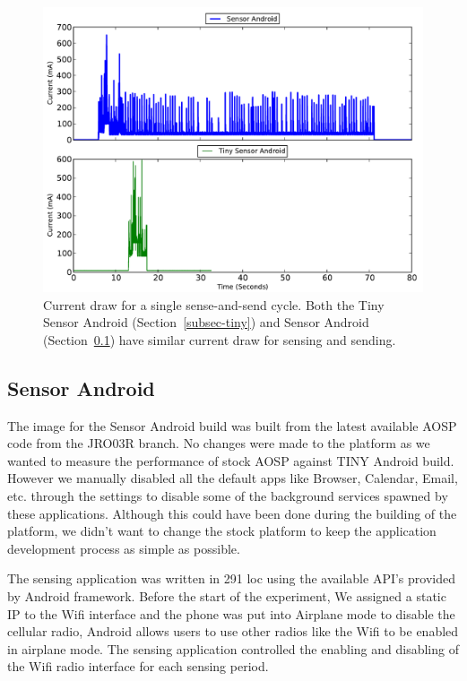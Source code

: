 \begin{figure}[t]
\includegraphics[width=\columnwidth]{./figures/samplecomparison.pdf}

\caption{\small Current draw for a single sense-and-send cycle.
\textnormal{Both the Tiny Sensor Android (Section~\ref{subsec-tiny}) and
            Sensor Android (Section~\ref{subsec-full}) have similar current draw for sensing and sending.}}

\label{fig-tinyandroid}
\end{figure}


\subsection{Sensor Android}
\label{subsec-full}

The image for the Sensor Android build was built from the latest available AOSP code from the JRO03R branch.
No changes were made to the platform as we wanted to measure the performance of stock AOSP against TINY Android build.
However we manually disabled all the default apps like Browser, Calendar, Email, etc. through the settings to disable some of the background services spawned by these applications. 
Although this could have been done during the building of the platform, we didn't want to change the stock platform to keep the application development process as simple as possible.

The sensing application was written in 291 loc using the available API's provided by Android framework. 
Before the start of the experiment, We assigned a static IP to the Wifi interface and the phone was put into Airplane mode to 
disable the cellular radio, Android allows users to use other radios like the Wifi to be enabled in airplane mode.
The sensing application controlled the enabling and disabling of the Wifi radio interface for each sensing period.

